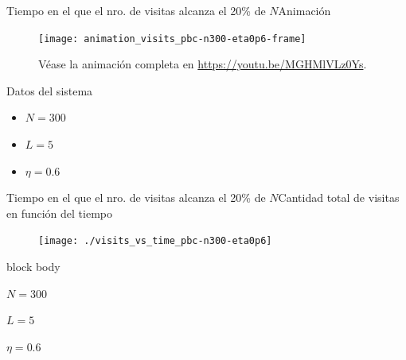 \documentclass{beamer}
\begin{document}
            \begin{frame}{Tiempo en el que el nro. de visitas alcanza el 20\% de $N$}{Animación}
                \begin{minipage}[t]{0.60\textwidth}
                    \begin{figure}[H!]
                        \texttt{[image: animation\_visits\_pbc-n300-eta0p6-frame]}
                        \caption*{Véase la animación completa en \url{https://youtu.be/MGHMlVLz0Ys}.}
                        \label{fig:pbc_1}
                    \end{figure}
                \end{minipage}
                \hfill
                \begin{minipage}[t]{0.30\textwidth}
                    \begin{block}{Datos del sistema}
                        \begin{itemize}
                            \item $N=300$
                            \item $L=5$
                            \item $\eta=0.6$
                        \end{itemize}
                    \end{block}
                \end{minipage}
            \end{frame}

            \begin{frame}{Tiempo en el que el nro. de visitas alcanza el 20\% de $N$}{Cantidad total de visitas en función del tiempo}
                \begin{figure}[H!]
                    \texttt{[image: ./visits\_vs\_time\_pbc-n300-eta0p6]}
                    \label{fig:pbc_2}
                \end{figure}
                \begin{beamercolorbox}[sep=5pt,center]{block body}
                    \begin{minipage}[t]{0.3\textwidth}
                        \centering
                        \small{$N=300$}
                    \end{minipage}
                    \hfill
                    \begin{minipage}[t]{0.3\textwidth}
                        \centering
                        \small{$L=5$}
                    \end{minipage}
                    \hfill
                    \begin{minipage}[t]{0.3\textwidth}
                        \centering
                        \small{$\eta=0.6$}
                    \end{minipage}
                \end{beamercolorbox}
            \end{frame}
\end{document}
